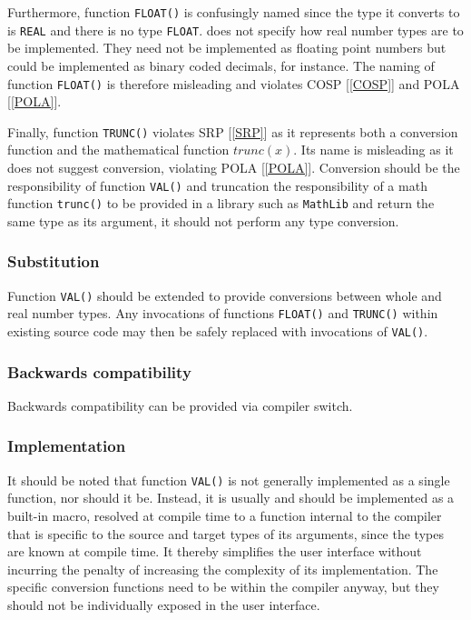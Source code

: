 \documentclass[10pt,a4paper]{article}
\begin{document}
Furthermore, function \verb|FLOAT()| is confusingly named since the type it
converts to is \verb|REAL| and there is no type \verb|FLOAT|. \cite{Wirth88}
does not specify how real number types are to be implemented. They need not be
implemented as floating point numbers but could be implemented as binary coded
decimals, for instance. The naming of function \verb|FLOAT()| is therefore
misleading and violates COSP [\ref{COSP}] and POLA [\ref{POLA}].

Finally, function \verb|TRUNC()| violates SRP [\ref{SRP}] as it represents
both a conversion function and the mathematical function $trunc(x)$.
Its name is misleading as it does not suggest conversion, violating
POLA [\ref{POLA}]. Conversion should be the responsibility of function
\verb|VAL()| and truncation the responsibility of a math function
\verb|trunc()| to be provided in a library such as \verb|MathLib| and
return the same type as its argument, it should not perform any type
conversion.

\subsubsection{Substitution}

Function \verb|VAL()| should be extended to provide conversions between whole
and real number types. Any invocations of functions \verb|FLOAT()| and
\verb|TRUNC()| within existing source code may then be safely replaced
with invocations of \verb|VAL()|.

\subsubsection{Backwards compatibility}

Backwards compatibility can be provided via compiler switch.

\subsubsection{Implementation}
It should be noted that function \verb|VAL()| is not generally implemented as a
single function, nor should it be. Instead, it is usually and should be
implemented as a built-in macro, resolved at compile time to a function
internal to the compiler that is specific to the source and target types of its
arguments, since the types are known at compile time. It thereby simplifies the
user interface without incurring the penalty of increasing the complexity of
its implementation. The specific conversion functions need to be within the
compiler anyway, but they should not be individually exposed in the user
interface.
\end{document}
